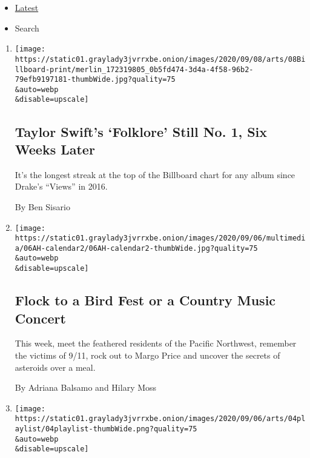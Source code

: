 \begin{itemize}
\tightlist
\item
  \protect\hyperlink{stream-panel}{Latest}
\item
  Search
\end{itemize}

\begin{enumerate}
\def\labelenumi{\arabic{enumi}.}
\item
  \href{/2020/09/07/arts/music/taylor-swifts-folklore-billboard.html}{}

  \texttt{[image: https://static01.graylady3jvrrxbe.onion/images/2020/09/08/arts/08Billboard-print/merlin\_172319805\_0b5fd474-3d4a-4f58-96b2-79efb9197181-thumbWide.jpg?quality=75\\\&auto=webp\\\&disable=upscale]}

  \hypertarget{taylor-swifts-folklore-still-no-1-six-weeks-later}{%
  \subsection{Taylor Swift's `Folklore' Still No. 1, Six Weeks
  Later}\label{taylor-swifts-folklore-still-no-1-six-weeks-later}}

  It's the longest streak at the top of the Billboard chart for any
  album since Drake's ``Views'' in 2016.

  By Ben Sisario
\item
  \href{/2020/09/05/at-home/things-to-do-at-home-this-week.html}{}

  \texttt{[image: https://static01.graylady3jvrrxbe.onion/images/2020/09/06/multimedia/06AH-calendar2/06AH-calendar2-thumbWide.jpg?quality=75\\\&auto=webp\\\&disable=upscale]}

  \hypertarget{flock-to-a-bird-fest-or-a-country-music-concert}{%
  \subsection{Flock to a Bird Fest or a Country Music
  Concert}\label{flock-to-a-bird-fest-or-a-country-music-concert}}

  This week, meet the feathered residents of the Pacific Northwest,
  remember the victims of 9/11, rock out to Margo Price and uncover the
  secrets of asteroids over a meal.

  By Adriana Balsamo and Hilary Moss
\item
  \href{/2020/09/04/arts/music/playlist-sza-ty-dolla-sign-finneas.html}{}

  \texttt{[image: https://static01.graylady3jvrrxbe.onion/images/2020/09/06/arts/04playlist/04playlist-thumbWide.png?quality=75\\\&auto=webp\\\&disable=upscale]}


\end{enumerate}
